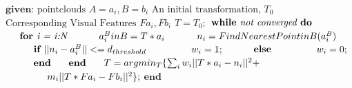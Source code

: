 \documentclass[letterpaper, 10pt, conference]{ieeeconf}
\begin{document}
$\textbf{given: } \text{pointclouds } A = a_{i}, B = b_{i} $ \newline
$\text{An initial transformation, $T_{0}$} $ \newline
$\text{Corresponding Visual Features } Fa_{i}, Fb_{i} $ \newline
$T = T_{0}; $\newline 
$\textbf{while} \emph{ not converged} \textbf{ do} $\newline
$\hspace*{5 mm} \textbf{for } \emph{i = i:N} $\newline
$ \hspace*{10mm} a^{B}_{i} in B = T * a_i$ \newline
$ \hspace*{10 mm} n_{i} = Find Nearest Point in B(a^{B}_{i}) $ \newline
$ \hspace*{10 mm} \textbf{if } ||n_{i}-a^{B}_{i}|| <= d_{threshold} $ \newline
$\hspace*{15 mm} w_i = 1; $ \newline
$\hspace*{10mm} \textbf{else} $ \newline
$\hspace*{15mm} w_i = 0; $ \newline
$\hspace*{10mm} \textbf{end} $\newline
$ \hspace*{5 mm} \textbf{end} $ \newline
$ \hspace*{5 mm} T = argmin_{T} \{\sum_{i} w_{i}||T*a_{i} - n_{i} || ^2 +$ \newline
$ \hspace*{15mm} m_{i} ||T*Fa_{i} - Fb_{i}||^2\}; $ \newline
$ \textbf{end} $ \newline
\end{document}
